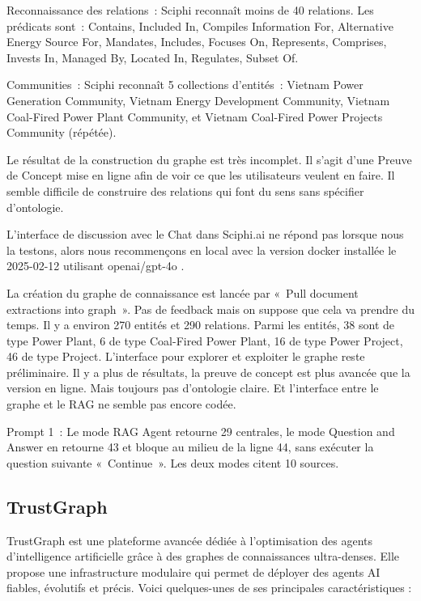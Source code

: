 \documentclass[a4paper,11pt]{report}
\begin{document}
Reconnaissance des relations~: Sciphi reconnaît moins de 40 relations. Les prédicats sont~: Contains, Included In, Compiles Information For, Alternative Energy Source For, Mandates, Includes, Focuses On, Represents, Comprises, Invests In, Managed By, Located In, Regulates, Subset Of.

Communities~: Sciphi reconnaît 5 collections d'entités~: Vietnam Power Generation Community, Vietnam Energy Development Community, Vietnam Coal-Fired Power Plant Community, et Vietnam Coal-Fired Power Projects Community (répétée).

Le résultat de la construction du graphe est très incomplet. Il s'agit d'une Preuve de Concept mise en ligne afin de voir ce que les utilisateurs veulent en faire. Il semble difficile de construire des relations qui font du sens sans spécifier d'ontologie.

L'interface de discussion avec le Chat dans Sciphi.ai ne répond pas lorsque nous la testons, alors nous recommençons en local avec la version docker installée le 2025-02-12 utilisant openai/gpt-4o .

La création du graphe de connaissance est lancée par «~Pull document extractions into graph~». Pas de feedback mais on suppose que cela va prendre du temps. Il y a environ 270 entités et 290 relations. Parmi les entités, 38 sont de type Power Plant, 6 de type Coal-Fired Power Plant, 16 de type Power Project, 46 de type Project. L'interface pour explorer et exploiter le graphe reste préliminaire. Il y a plus de résultats, la preuve de concept est plus avancée que la version en ligne. Mais toujours pas d'ontologie claire. Et l'interface entre le graphe et le RAG ne semble pas encore codée.

Prompt 1~: Le mode RAG Agent retourne 29 centrales, le mode Question and Answer en retourne 43 et bloque au milieu de la ligne 44, sans exécuter la question suivante «~Continue~». Les deux modes citent 10 sources.

\subsection{TrustGraph}\label{trustgraph}

TrustGraph est une plateforme avancée dédiée à l'optimisation des agents d'intelligence artificielle grâce à des graphes de connaissances ultra-denses. Elle propose une infrastructure modulaire qui permet de déployer des agents AI fiables, évolutifs et précis. Voici quelques-unes de ses principales caractéristiques :
\end{document}
